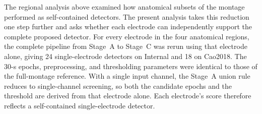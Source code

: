 The regional analysis above examined how anatomical subsets of the montage performed as self-contained detectors. The present analysis takes this reduction one step further and asks whether each electrode can independently support the complete proposed detector. For every electrode in the four anatomical regions, the complete pipeline from Stage~A to Stage~C was rerun using that electrode alone, giving 24 single-electrode detectors on Internal and 18 on Cao2018. The 30-s epochs, preprocessing, and thresholding parameters were identical to those of the full-montage reference. With a single input channel, the Stage~A union rule reduces to single-channel screening, so both the candidate epochs and the threshold are derived from that electrode alone. Each electrode's score therefore reflects a self-contained single-electrode detector.
